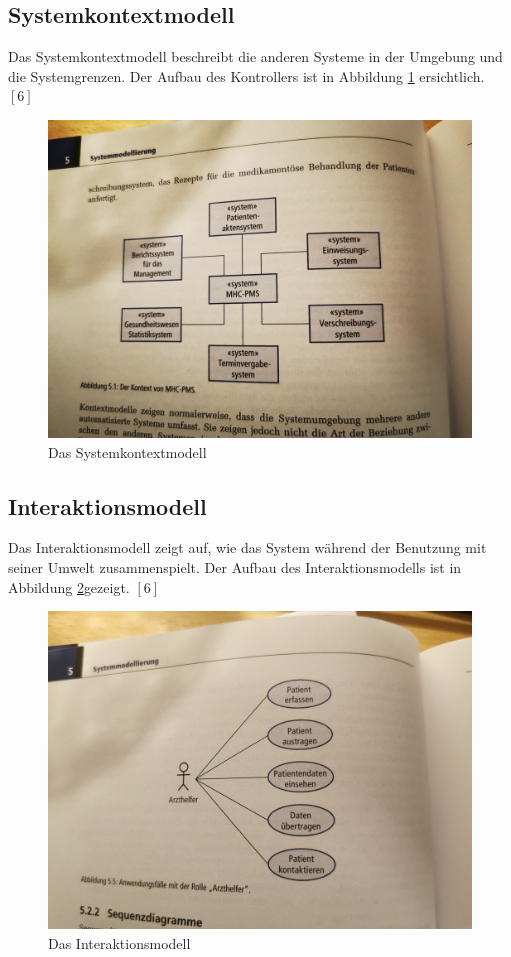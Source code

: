 \subsection{Systemkontextmodell}
Das Systemkontextmodell beschreibt die anderen Systeme in der Umgebung und die Systemgrenzen. Der Aufbau des Kontrollers ist in Abbildung \ref{fig:systemkontextmodell} ersichtlich. $[6]$

\begin{figure}
    \centering
    \includegraphics[scale=0.1]{98_images/systemkontextmodell.jpg}
    \caption{Das Systemkontextmodell}
    \label{fig:systemkontextmodell}
\end{figure}

\subsection{Interaktionsmodell}
Das Interaktionsmodell zeigt auf, wie das System während der Benutzung mit seiner Umwelt zusammenspielt. Der Aufbau des Interaktionsmodells ist in Abbildung \ref{fig:interaktionsmodell}gezeigt. $[6]$

\begin{figure}
    \centering
    \includegraphics[scale=0.1]{98_images/interaktionsmodell.jpg}
    \caption{Das Interaktionsmodell}
    \label{fig:interaktionsmodell}
\end{figure}


